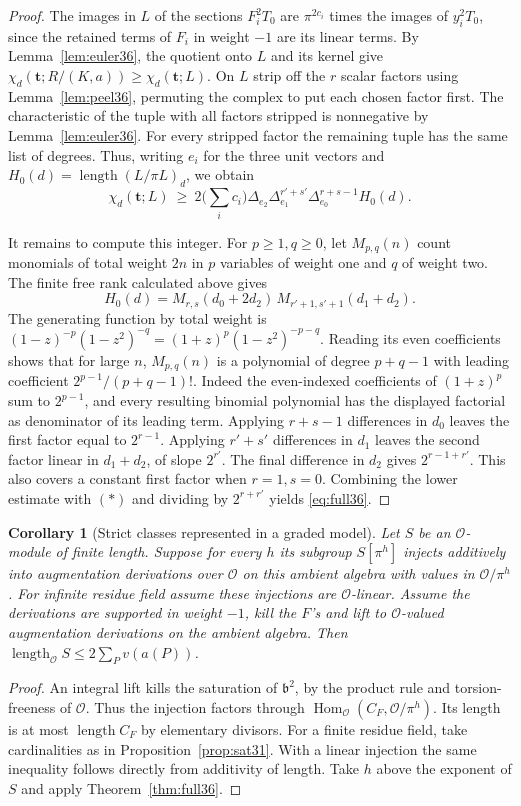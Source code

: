 \documentclass[a4paper,11pt]{article}
\newtheorem{corollary}[proposition]{Corollary}
\theoremstyle{definition}
\theoremstyle{remark}
\newcommand{\len}{\operatorname{length}}\newcommand{\Res}{\operatorname*{Res}}
\numberwithin{equation}{section}
\newcommand{\OO}{\mathcal O}
\begin{document}
\begin{proof}
The images in \(L\) of the sections \(F_i^2T_0\) are \(\pi^{2c_i}\) times the images of \(y_i^2T_0\), since the retained terms of \(F_i\) in weight \(-1\) are its linear terms. By Lemma~\ref{lem:euler36}, the quotient onto \(L\) and its kernel give \(\chi_d(\mathbf t;R/(K,a))\ge\chi_d(\mathbf t;L)\). On \(L\) strip off the \(r\) scalar factors using Lemma~\ref{lem:peel36}, permuting the complex to put each chosen factor first. The characteristic of the tuple with all factors stripped is nonnegative by Lemma~\ref{lem:euler36}. For every stripped factor the remaining tuple has the same list of degrees. Thus, writing \(e_i\) for the three unit vectors and \(H_0(d)=\len (L/\pi L)_d\), we obtain
\[
 \chi_d(\mathbf t;L)\ \ge\ 2\Big(\sum_i c_i\Big)
      \Delta_{e_2}\Delta_{e_1}^{r'+s'}\Delta_{e_0}^{r+s-1} H_0(d).
\]

It remains to compute this integer. For \(p\ge1,q\ge0\), let \(M_{p,q}(n)\) count monomials of total weight \(2n\) in \(p\) variables of weight one and \(q\) of weight two. The finite free rank calculated above gives
\[
 H_0(d)=M_{r,s}(d_0+2d_2)\,
                   M_{r'+1,s'+1}(d_1+d_2).
\]
The generating function by total weight is
\((1-z)^{-p}(1-z^2)^{-q}=(1+z)^p(1-z^2)^{-p-q}\).
Reading its even coefficients shows that for large \(n\), \(M_{p,q}(n)\) is a polynomial of degree \(p+q-1\) with leading coefficient \(2^{p-1}/(p+q-1)!\). Indeed the even-indexed coefficients of \((1+z)^p\) sum to \(2^{p-1}\), and every resulting binomial polynomial has the displayed factorial as denominator of its leading term. Applying \(r+s-1\) differences in \(d_0\) leaves the first factor equal to \(2^{r-1}\). Applying \(r'+s'\) differences in \(d_1\) leaves the second factor linear in \(d_1+d_2\), of slope \(2^{r'}\). The final difference in \(d_2\) gives \(2^{r-1+r'}\). This also covers a constant first factor when \(r=1,s=0\). Combining the lower estimate with \((\ast)\) and dividing by \(2^{r+r'}\) yields \eqref{eq:full36}.
\end{proof}

\begin{corollary}[Strict classes represented in a graded model]\label{cor:model36}
Let \(S\) be an \(\OO\)-module of finite length. Suppose for every \(h\) its subgroup \(S[\pi^h]\) injects additively into augmentation derivations over \(\OO\) on this ambient algebra with values in \(\OO/\pi^h\). For infinite residue field assume these injections are \(\OO\)-linear. Assume the derivations are supported in weight \(-1\), kill the \(F\)'s and lift to \(\OO\)-valued augmentation derivations on the ambient algebra. Then \(\len_{\OO}S\le 2\sum_P v(a(P))\).
\end{corollary}
\begin{proof}
An integral lift kills the saturation of \(\mathfrak b^2\), by the product rule and torsion-freeness of \(\OO\). Thus the injection factors through \(\operatorname{Hom}_{\OO}(C_F,\OO/\pi^h)\). Its length is at most \(\len C_F\) by elementary divisors. For a finite residue field, take cardinalities as in Proposition~\ref{prop:sat31}. With a linear injection the same inequality follows directly from additivity of length. Take \(h\) above the exponent of \(S\) and apply Theorem~\ref{thm:full36}.
\end{proof}
\end{document}
